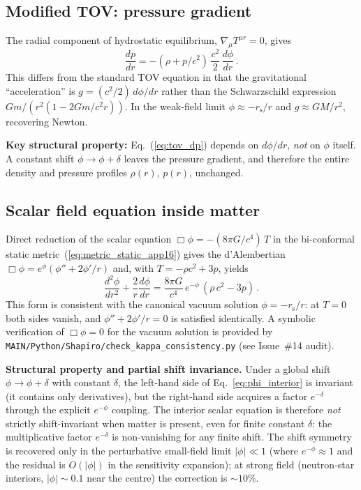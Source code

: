 \documentclass[11pt]{article}
\newcommand{\rs}{r_{\mathrm{s}}}
\begin{document}
\subsection{Modified TOV: pressure gradient}

The radial component of hydrostatic equilibrium,
$\nabla_\mu T^{\mu r} = 0$, gives
\begin{equation}\label{eq:tov_dp}
  \frac{dp}{dr} = -(\rho + p/c^2)\,\frac{c^2}{2}\,
  \frac{d\phi}{dr}\,.
\end{equation}
This differs from the standard TOV equation in that the
gravitational ``acceleration'' is $g = (c^2/2)\,d\phi/dr$
rather than the Schwarzschild expression
$Gm/(r^2(1-2Gm/c^2r))$.  In the weak-field limit
$\phi \approx -\rs/r$ and
$g \approx GM/r^2$, recovering Newton.

\textbf{Key structural property:} Eq.~(\ref{eq:tov_dp})
depends on $d\phi/dr$, \emph{not} on $\phi$ itself.
A constant shift $\phi \to \phi + \delta$ leaves the
pressure gradient, and therefore the entire density and
pressure profiles $\rho(r)$, $p(r)$, unchanged.

\subsection{Scalar field equation inside matter}

Direct reduction of the scalar equation
$\Box\phi = -(8\pi G/c^4)\,T$ in the bi-conformal static
metric~(\ref{eq:metric_static_app16}) gives the
d'Alembertian $\Box\phi = e^{\phi}(\phi''+2\phi'/r)$ and,
with $T = -\rho c^2 + 3p$, yields
\begin{equation}\label{eq:phi_interior}
  \frac{d^2\phi}{dr^2} + \frac{2}{r}\frac{d\phi}{dr}
  = \frac{8\pi G}{c^4}\,e^{-\phi}\,
  (\rho\,c^2 - 3p)\,.
\end{equation}
This form is consistent with the canonical vacuum solution
$\phi = -\rs/r$: at $T=0$ both sides vanish, and
$\phi''+2\phi'/r = 0$ is satisfied identically.  A
symbolic verification of $\Box\phi = 0$ for the vacuum
solution is provided by
\texttt{MAIN/Python/Shapiro/check\_kappa\_consistency.py} (see Issue~\#14
audit).

\textbf{Structural property and partial shift invariance.}
Under a global shift $\phi\to\phi+\delta$ with constant
$\delta$, the left-hand side of
Eq.~\eqref{eq:phi_interior} is invariant (it contains only
derivatives), but the right-hand side acquires a factor
$e^{-\delta}$ through the explicit $e^{-\phi}$ coupling.
The interior scalar equation is therefore \emph{not}
strictly shift-invariant when matter is present, even
for finite constant $\delta$: the multiplicative factor
$e^{-\delta}$ is non-vanishing for any finite shift.  The
shift symmetry is recovered only in the perturbative
small-field limit $|\phi|\ll 1$ (where $e^{-\phi}\approx 1$
and the residual is $O(|\phi|)$ in the sensitivity
expansion); at strong field (neutron-star interiors,
$|\phi|\sim 0.1$ near the centre) the correction is
$\sim 10\%$.
\end{document}

